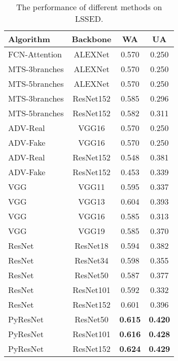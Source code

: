 \documentclass{article}
\begin{document}
\begin{table}[htbp]
  \caption{The performance of different methods on LSSED.}
  \label{tab:results_1}
\centering
  \begin{tabular}{ lccc }
    \hline
    \textbf{Algorithm} & \textbf{Backbone} & \textbf{WA}  & \textbf{UA}\\ 
    \hline
    FCN-Attention\cite{zhang2018attention}  &    ALEXNet  &   0.570  &  0.250   \\
    MTS-3branches\cite{guizzo2020multi}  &    ALEXNet  &   0.570  &  0.250   \\
    MTS-5branches\cite{guizzo2020multi}  &    ALEXNet  &   0.570  &  0.250   \\
    MTS-3branches\cite{guizzo2020multi}  &    ResNet152  &   0.585  &  0.296   \\
    MTS-5branches\cite{guizzo2020multi}  &    ResNet152  &   0.582  &  0.311   \\
    ADV-Real\cite{ren2020generating}   &    VGG16  &   0.570  &  0.250   \\
    ADV-Fake\cite{ren2020generating}   &    VGG16  &   0.570  &  0.250   \\    
    ADV-Real\cite{ren2020generating}   &    ResNet152  &   0.548  &  0.381   \\
    ADV-Fake\cite{ren2020generating}   &    ResNet152  &   0.453  &  0.339   \\
    \hline
    VGG\cite{simonyan2014very}          &    VGG11              &   0.595  &  0.337    \\
    VGG\cite{simonyan2014very}          &    VGG13              &   0.604  &  0.393    \\
    VGG\cite{simonyan2014very}          &    VGG16              &   0.585  &  0.313    \\
    VGG\cite{simonyan2014very}          &    VGG19              &   0.585  &  0.370    \\

    ResNet\cite{he2016deep}             &    ResNet18           &   0.594  &  0.382  \\
    ResNet\cite{he2016deep}             &    ResNet34           &   0.598  &  0.355  \\
    ResNet\cite{he2016deep}             &    ResNet50           &   0.587  &  0.377  \\
    ResNet\cite{he2016deep}             &    ResNet101          &   0.592  &  0.332  \\
    ResNet\cite{he2016deep}             &    ResNet152          &   0.601  &  0.396  \\
    \hline
    PyResNet                            &    ResNet50           &   \textbf{0.615}  &  \textbf{0.420}  \\
    PyResNet                            &    ResNet101          &   \textbf{0.616}  &  \textbf{0.428}  \\
    PyResNet                            &    ResNet152          &   \textbf{0.624}  &  \textbf{0.429}  \\
    \hline
    \end{tabular}
\end{table}
\end{document}
